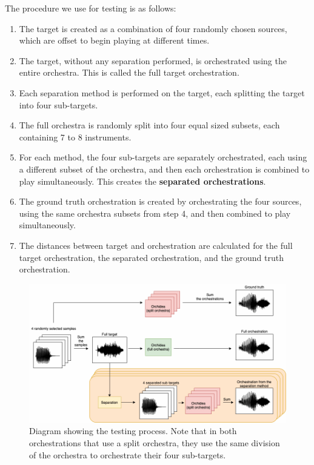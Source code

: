 \documentclass{article}
\begin{document}
    The procedure we use for testing is as follows:
    \begin{enumerate}
      \item The target is created as a combination of four randomly chosen sources, which are offset to begin playing at different times.
      \item The target, without any separation performed, is orchestrated using the entire orchestra. This is called the full target orchestration.
      \item Each separation method is performed on the target, each splitting the target into four sub-targets. 
      \item The full orchestra is randomly split into four equal sized subsets, each containing 7 to 8 instruments.
      \item For each method, the four sub-targets are separately orchestrated, each using a different subset of the orchestra, and then each orchestration is combined to play simultaneously. This creates the \textbf{separated orchestrations}.
      \item The ground truth orchestration is created by orchestrating the four sources, using the same orchestra subsets from step 4, and then combined to play simultaneously.
      \item The distances between target and orchestration are calculated for the full target orchestration, the separated orchestration, and the ground truth orchestration. 
    \end{enumerate} 

    \begin{figure}[t]
      \centering
        \includegraphics[width=\textwidth]{figures/evaluation_diagram.png}
        \caption{Diagram showing the testing process. Note that in both orchestrations that use a split orchestra, they use the same division of the orchestra to orchestrate their four sub-targets.}\label{fig:eval_diagram}
    \end{figure}
    
\end{document}
